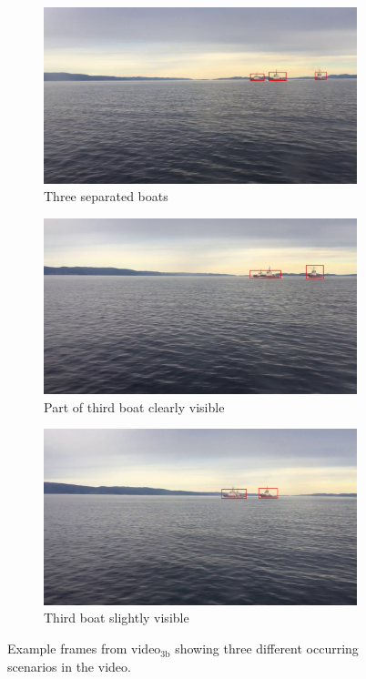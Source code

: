 \begin{figure}[h!]
\centering
\begin{subfigure}[b]{0.78\textwidth}
   \includegraphics[width=1\linewidth]{results/video/video3/frame677.jpg}
   \caption{Three separated boats}
   \label{fig:video3_sep} 
\end{subfigure}

\begin{subfigure}[b]{0.78\textwidth}
   \includegraphics[width=1\linewidth]{results/video/video3/frame479.jpg}
   \caption{Part of third boat clearly visible}
   \label{fig:video3_bigboat}
\end{subfigure}

\begin{subfigure}[b]{0.78\textwidth}
   \includegraphics[width=1\linewidth]{results/video/video3/frame208.jpg}
   \caption{Third boat slightly visible}
   \label{fig:video3_slightly}
\end{subfigure}
\caption{Example frames from video$_{\text{3b}}$ showing three different occurring scenarios in the video.}
\label{fig:video3}
\end{figure}

